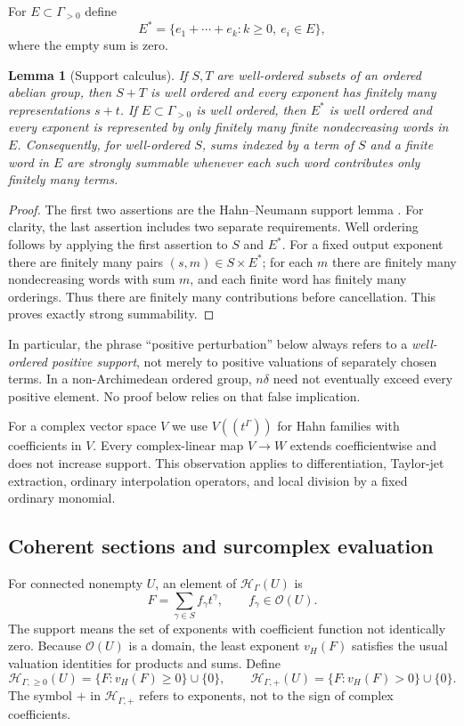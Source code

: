 \documentclass[11pt,letterpaper]{article}
\newtheorem{lemma}[theorem]{Lemma}
\theoremstyle{definition}
\theoremstyle{remark}
\newcommand{\OO}{\mathcal O}
\newcommand{\HH}{\mathscr H_\Gamma}
\newcommand{\HP}{\mathscr H_{\Gamma,+}}
\newcommand{\HA}{\mathscr H_{\Gamma,\ge0}}
\numberwithin{equation}{section}
\begin{document}
For $E\subset\Gamma_{>0}$ define
\[
 E^*=\{e_1+\cdots+e_k:k\ge0,\ e_i\in E\},
\]
where the empty sum is zero.
\begin{lemma}[Support calculus]\label{lem:support}
If $S,T$ are well-ordered subsets of an ordered abelian group, then $S+T$ is well ordered and every exponent has finitely many representations $s+t$. If $E\subset\Gamma_{>0}$ is well ordered, then $E^*$ is well ordered and every exponent is represented by only finitely many finite nondecreasing words in $E$. Consequently, for well-ordered $S$, sums indexed by a term of $S$ and a finite word in $E$ are strongly summable whenever each such word contributes only finitely many terms.
\end{lemma}
\begin{proof}
The first two assertions are the Hahn--Neumann support lemma \cite{Neumann}. For clarity, the last assertion includes two separate requirements. Well ordering follows by applying the first assertion to $S$ and $E^*$. For a fixed output exponent there are finitely many pairs $(s,m)\in S\times E^*$; for each $m$ there are finitely many nondecreasing words with sum $m$, and each finite word has finitely many orderings. Thus there are finitely many contributions before cancellation. This proves exactly strong summability.
\end{proof}
In particular, the phrase ``positive perturbation'' below always refers to a \emph{well-ordered positive support}, not merely to positive valuations of separately chosen terms. In a non-Archimedean ordered group, $n\delta$ need not eventually exceed every positive element. No proof below relies on that false implication.

For a complex vector space $V$ we use $V((t^\Gamma))$ for Hahn families with coefficients in $V$. Every complex-linear map $V\to W$ extends coefficientwise and does not increase support. This observation applies to differentiation, Taylor-jet extraction, ordinary interpolation operators, and local division by a fixed ordinary monomial.

\subsection{Coherent sections and surcomplex evaluation}
For connected nonempty $U$, an element of $\HH(U)$ is
\[
 F=\sum_{\gamma\in S}f_\gamma t^\gamma,
 \qquad f_\gamma\in\OO(U).
\]
The support means the set of exponents with coefficient function not identically zero. Because $\OO(U)$ is a domain, the least exponent $v_H(F)$ satisfies the usual valuation identities for products and sums. Define
\[
 \HA(U)=\{F:v_H(F)\ge0\}\cup\{0\},\qquad
 \HP(U)=\{F:v_H(F)>0\}\cup\{0\}.
\]
The symbol $+$ in $\HP$ refers to exponents, not to the sign of complex coefficients.
\end{document}
